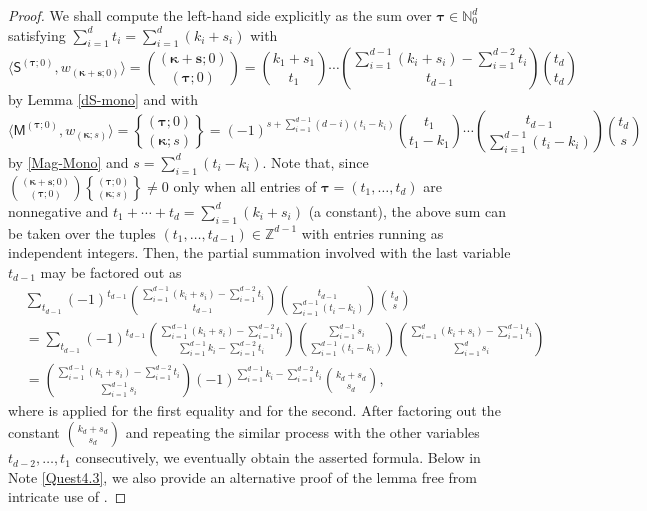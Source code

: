 \documentclass[10pt]{article}
\theoremstyle{definition}
\theoremstyle{remark}
\DeclareRobustCommand{\magnus}{\genfrac\{\}{0pt}{}}
\def\MM{{\mathsf{M}}}
\def\SS{{\mathsf{S}}}
\def\bs{{\mathbf{s}}}
\def\bkappa{{\boldsymbol \kappa}}
\def\btau{{\boldsymbol \tau}}
\def\N{{\mathbb N}}
\def\Z{{\mathbb Z}}
\def\la{\langle}
\def\ra{\rangle}
\def\bkappa{{\boldsymbol \kappa}}
\begin{document}
\begin{proof}
We shall compute the left-hand side explicitly
as the sum over 
$\btau\in\N_0^d$ satisfying
$\sum_{i=1}^d t_i=\sum_{i=1}^d (k_i+s_i)$
with
$$
\la\SS^{(\btau;0)},w_{(\bkappa+\bs;0)}\ra=\binom{(\bkappa+\bs;0)}{(\btau;0)}
=\binom{k_1+s_1}{t_1} 
\cdots
\binom{\sum_{i=1}^{d-1}(k_i+s_i)-\sum_{i=1}^{d-2}t_i}{t_{d-1}}
\binom{t_d}{t_d}
$$
by Lemma \ref{dS-mono} and with
\small $$
\la\MM^{(\btau;0)}, w_{(\bkappa;s)}\ra
=\magnus{(\btau;0)}{(\bkappa;s)}
=(-1)^{s+\sum_{i=1}^{d-1}(d-i)(t_i-k_i)}
\binom{t_1}{t_1-k_1}
\cdots
\binom{t_{d-1}}{\sum_{i=1}^{d-1}(t_i-k_i)}
\binom{t_d}{s}
$$ \normalsize
by \eqref{Mag-Mono} and
$s=\sum_{i=1}^{d}(t_i-k_i)$. 
Note that,
since $\binom{(\bkappa+\bs;0)}{(\btau;0)}\magnus{(\btau;0)}{(\bkappa;s)}\ne 0$ 
only when all entries of $\btau=(t_1,\dots,t_d)$ are nonnegative
and $t_1+\cdots+t_d=\sum_{i=1}^d (k_i+s_i)$ (a constant),
the above sum
can be taken over the tuples $(t_1,\dots,t_{d-1})\in\Z^{d-1}$
with entries running as independent integers.
Then, the partial summation involved with the last variable 
$t_{d-1}$ may be factored out as
\small \begin{align*}
&\sum_{t_{d-1}}(-1)^{t_{d-1}}
\binom{\sum_{i=1}^{d-1}(k_i+s_i)-\sum_{i=1}^{d-2}t_i}{t_{d-1}}
\binom{t_{d-1}}{\sum_{i=1}^{d-1}(t_i-k_i)}
\binom{t_d}{s} \\
&=\sum_{t_{d-1}}(-1)^{t_{d-1}}
\binom{\sum_{i=1}^{d-1}(k_i+s_i)-\sum_{i=1}^{d-2}t_i}{ \sum_{i=1}^{d-1}k_i-\sum_{i=1}^{d-2}t_i }
\binom{\sum_{i=1}^{d-1} s_i}{\sum_{i=1}^{d-1}(t_i-k_i)}
\binom{\sum_{i=1}^d(k_i+s_i)-\sum_{i=1}^{d-1}t_i}{\sum_{i=1}^{d} s_i} \\
&=\binom{\sum_{i=1}^{d-1}(k_i+s_i)-\sum_{i=1}^{d-2}t_i}{\sum_{i=1}^{d-1} s_i}
(-1)^{\sum_{i=1}^{d-1}k_i -\sum_{i=1}^{d-2} t_i}
\binom{k_d+s_d}{s_d},
\end{align*} \normalsize
where \cite[(5.21)]{GKP} is applied for the first equality and 
\cite[(5.24)]{GKP} for the second.
After factoring out the constant $\binom{k_d+s_d}{s_d}$ and repeating
the similar process with the other variables $t_{d-2},\dots, t_1$ consecutively,
we eventually obtain the asserted formula.
Below in Note \ref{Quest4.3}, we also provide an alternative proof of the lemma 
free from intricate use of 
\cite[(5.21),(5.24)]{GKP}.
\end{proof}
\end{document}
